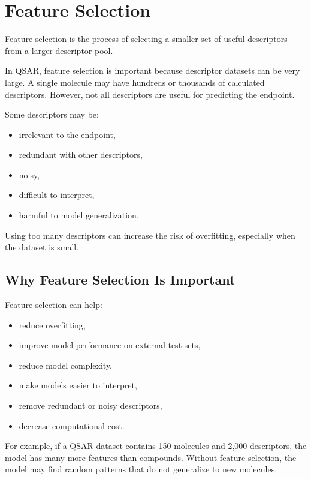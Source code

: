 \documentclass[11pt]{report}
\newenvironment{Important note}{\begin{quote}\color{red}\textbf{Important note:} }{\end{quote}}
\begin{document}
\section{Feature Selection}

Feature selection is the process of selecting a smaller set of useful descriptors from a larger descriptor pool.

In QSAR, feature selection is important because descriptor datasets can be very large. A single molecule may have hundreds or thousands of calculated descriptors. However, not all descriptors are useful for predicting the endpoint.

Some descriptors may be:

\begin{itemize}[leftmargin=*]
    \item irrelevant to the endpoint,
    \item redundant with other descriptors,
    \item noisy,
    \item difficult to interpret,
    \item harmful to model generalization.
\end{itemize}

Using too many descriptors can increase the risk of overfitting, especially when the dataset is small.

\subsection{Why Feature Selection Is Important}

Feature selection can help:

\begin{itemize}[leftmargin=*]
    \item reduce overfitting,
    \item improve model performance on external test sets,
    \item reduce model complexity,
    \item make models easier to interpret,
    \item remove redundant or noisy descriptors,
    \item decrease computational cost.
\end{itemize}

For example, if a QSAR dataset contains 150 molecules and 2,000 descriptors, the model has many more features than compounds. Without feature selection, the model may find random patterns that do not generalize to new molecules.
\end{document}
